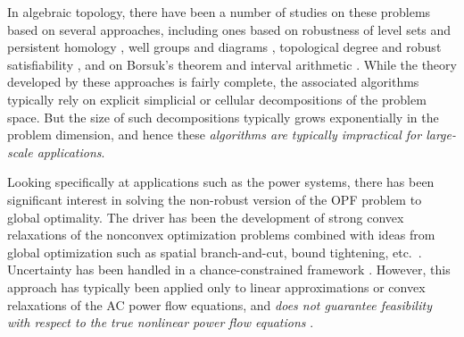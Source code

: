 In algebraic topology, there have been a number of studies on these problems based on several approaches, including ones based on robustness of level sets and persistent homology \cite{BeEdMoPa2010,EdMoPa2011}, well groups and diagrams \cite{ChSkPa2012,FrKr2016well,FrKr2016pers}, topological degree and robust satisfiability \cite{FrKr2015,FrKrWa2016},  and on Borsuk's theorem and interval arithmetic \cite{FrRa2015,FrHoLa2007,FrLa2005}.
While the theory developed by these approaches is fairly complete, the associated algorithms typically rely on explicit simplicial or cellular decompositions of the problem space.
But the size of such decompositions typically grows exponentially in the problem dimension, and hence these \emph{algorithms are typically impractical for large-scale applications}.

Looking specifically at applications such as the power systems, there has been significant interest in solving the non-robust version of the OPF problem to global optimality.
The driver has been the development of strong convex relaxations of the nonconvex optimization problems combined with ideas from global optimization such as spatial branch-and-cut, bound tightening, etc.~\cite{BiMu2016,coffrin2015strengthening}.
Uncertainty has been handled in a chance-constrained framework \cite{BiChHa2014,zhang2011chance}.
However, this approach has typically been applied only to linear approximations or convex relaxations of the AC power flow equations, and \emph{does not guarantee feasibility with respect to the true nonlinear power flow equations} \cite{BiChHa2014,kocuk2016strong,RoVrOlAn2015,TsBiTa2016}.
